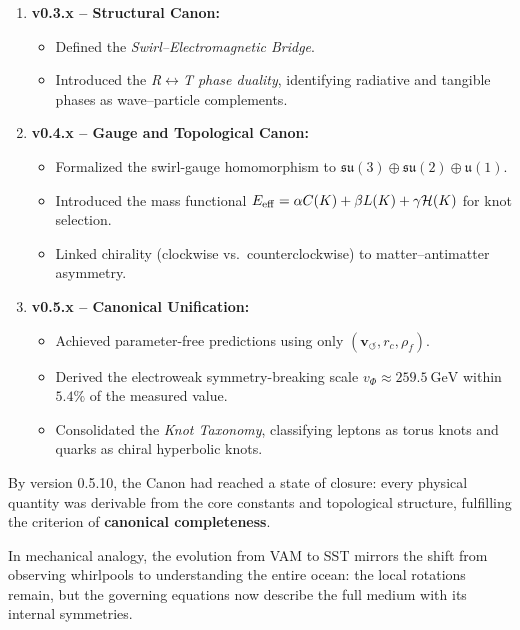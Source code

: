 \documentclass[10pt,reprint,aps,onecolumn,nofootinbib]{revtex4-2}
\newcommand{\vswirl}{\mathbf{v}_{\!\boldsymbol{\circlearrowleft}}}
\newcommand{\rhof}{\rho_{\!f}}                           %
\newcommand{\rc}{r_c}                                    %
\providecommand{\rc}{r_c}
\begin{document}
        \begin{enumerate}
        \item \textbf{v0.3.x -- Structural Canon:}
        \begin{itemize}
        \item Defined the \emph{Swirl--Electromagnetic Bridge}.
        \item Introduced the \emph{R$\leftrightarrow$T phase duality}, identifying radiative and tangible phases as wave--particle complements.
        \end{itemize}

        \item \textbf{v0.4.x -- Gauge and Topological Canon:}
        \begin{itemize}
        \item Formalized the swirl-gauge homomorphism to $\mathfrak{su}(3)\oplus\mathfrak{su}(2)\oplus\mathfrak{u}(1)$.
        \item Introduced the mass functional $E_{\rm eff}=\alpha C(K)+\beta L(K)+\gamma \mathcal{H}(K)$ for knot selection.
        \item Linked chirality (clockwise vs.\ counterclockwise) to matter--antimatter asymmetry.
        \end{itemize}

        \item \textbf{v0.5.x -- Canonical Unification:}
        \begin{itemize}
        \item Achieved parameter-free predictions using only $(\vswirl,\rc,\rhof)$.
        \item Derived the electroweak symmetry-breaking scale $v_\Phi\approx259.5~\text{GeV}$ within $5.4\%$ of the measured value.
        \item Consolidated the \emph{Knot Taxonomy}, classifying leptons as torus knots and quarks as chiral hyperbolic knots.
        \end{itemize}
        \end{enumerate}

        By version 0.5.10, the Canon had reached a state of closure: every physical quantity was derivable from the core constants and topological structure, fulfilling the criterion of \textbf{canonical completeness}.

        \begin{tcolorbox}[colback=gray!5,colframe=black,title={Summary Analogy}]
        In mechanical analogy, the evolution from VAM to SST mirrors the shift from observing whirlpools to understanding the entire ocean: the local rotations remain, but the governing equations now describe the full medium with its internal symmetries.
        \end{tcolorbox}
\end{document}

